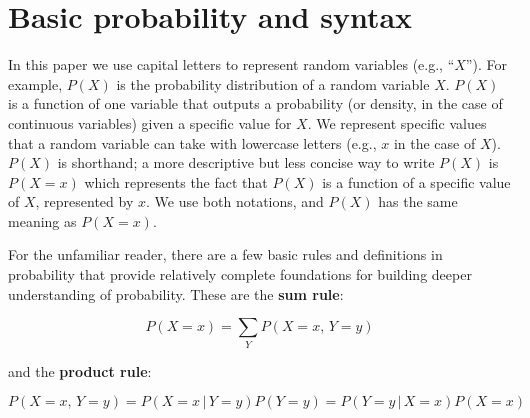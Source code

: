 \documentclass[12pt]{article}
\begin{document}
\appendix
\section{Basic probability and syntax}
\label{prob-theory}

In this paper we use capital letters to represent random variables
(e.g., ``$X$''). For example, $P(X)$ is the probability distribution
of a random variable $X$. $P(X)$ is a function of one variable that
outputs a probability (or density, in the case of continuous
variables) given a specific value for $X$. We represent specific
values that a random variable can take with lowercase letters (e.g.,
$x$ in the case of $X$). $P(X)$ is shorthand; a more descriptive but
less concise way to write $P(X)$ is $P(X=x)$ which represents the fact
that $P(X)$ is a function of a specific value of $X$, represented by
$x$. We use both notations, and $P(X)$ has the same meaning as
$P(X=x)$.

For the unfamiliar reader, there are a few basic rules and definitions
in probability that provide relatively complete foundations for
building deeper understanding of probability. These are the
\textbf{sum rule}:

\begin{equation} P(X=x) = \sum_Y P(X=x,\, Y=y)
  \label{eq:sum}
\end{equation}

and the \textbf{product rule}:

\begin{equation} P(X=x, \, Y=y) = P(X = x \, | \, Y=y ) P(Y=y) = P(Y =
  y \, | \, X=x ) P(X=x)
  \label{eq:product}
\end{equation}
\end{document}
